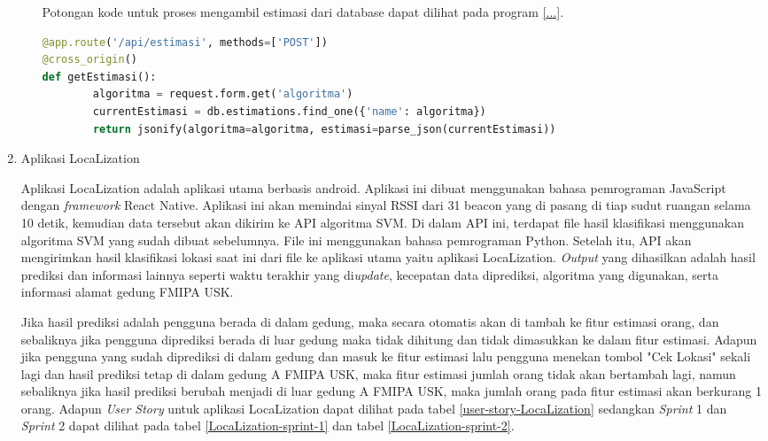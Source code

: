 \begin{enumerate}[1.]
\begin{enumerate}[a.]
		            Potongan kode untuk proses mengambil estimasi dari database dapat dilihat pada program \ref{...}.
		            \begin{lstlisting}[language=Python]
@app.route('/api/estimasi', methods=['POST'])
@cross_origin()
def getEstimasi():
		algoritma = request.form.get('algoritma')
		currentEstimasi = db.estimations.find_one({'name': algoritma})
		return jsonify(algoritma=algoritma, estimasi=parse_json(currentEstimasi))		\end{lstlisting}
	      \end{enumerate}
	\item Aplikasi LocaLization
	      \par Aplikasi LocaLization adalah aplikasi utama berbasis android. Aplikasi ini dibuat menggunakan bahasa pemrograman JavaScript dengan \textit{framework} React Native. Aplikasi ini akan memindai sinyal RSSI dari 31 beacon yang di pasang di tiap sudut ruangan selama 10 detik, kemudian data tersebut akan dikirim ke API algoritma SVM. Di dalam API ini, terdapat file hasil klasifikasi menggunakan algoritma SVM yang sudah dibuat sebelumnya. File ini menggunakan bahasa pemrograman Python. Setelah itu, API akan mengirimkan hasil klasifikasi lokasi saat ini dari file ke aplikasi utama yaitu aplikasi LocaLization. \textit{Output} yang dihasilkan adalah hasil prediksi dan informasi lainnya seperti waktu terakhir yang di\textit{update}, kecepatan data diprediksi, algoritma yang digunakan, serta informasi alamat gedung FMIPA USK.
	      \par Jika hasil prediksi adalah pengguna berada di dalam gedung, maka secara otomatis akan di tambah ke fitur estimasi orang, dan sebaliknya jika pengguna diprediksi berada di luar gedung maka tidak dihitung dan tidak dimasukkan ke dalam fitur estimasi. Adapun jika pengguna yang sudah diprediksi di dalam gedung dan masuk ke fitur estimasi lalu pengguna menekan tombol "Cek Lokasi" sekali lagi dan hasil prediksi tetap di dalam gedung A FMIPA USK, maka fitur estimasi jumlah orang tidak akan bertambah lagi, namun sebaliknya jika hasil prediksi berubah menjadi di luar gedung A FMIPA USK, maka jumlah orang pada fitur estimasi akan berkurang 1 orang. Adapun \textit{User Story} untuk aplikasi LocaLization dapat dilihat pada tabel \ref{user-story-LocaLization} sedangkan \textit{Sprint} 1 dan \textit{Sprint} 2 dapat dilihat pada tabel \ref{LocaLization-sprint-1} dan tabel \ref{LocaLization-sprint-2}.


\end{enumerate}
